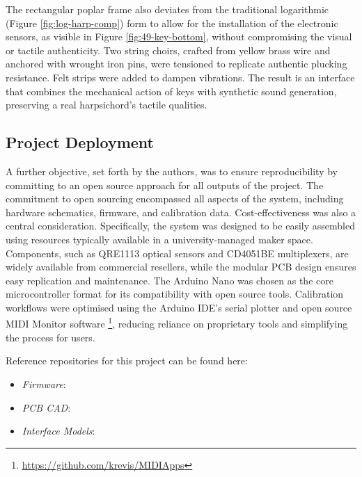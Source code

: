 The rectangular poplar frame also deviates from the traditional logarithmic (Figure \ref{fig:log-harp-comp}) form to allow for the installation of the electronic sensors, as visible in Figure \ref{fig:49-key-bottom}, without compromising the visual or tactile authenticity. Two string choirs, crafted from yellow brass wire and anchored with wrought iron pins, were tensioned to replicate authentic plucking resistance. Felt strips were added to dampen vibrations. The result is an interface that combines the mechanical action of keys with synthetic sound generation, preserving a real harpsichord's tactile qualities.


\subsection{Project Deployment}

A further objective, set forth by the authors, was to ensure reproducibility by committing to an open source approach for all outputs of the project. The commitment to open sourcing encompassed all aspects of the system, including hardware schematics, firmware, and calibration data. Cost-effectiveness was also a central consideration. 
Specifically, the system was designed to be easily assembled using resources typically available in a university-managed maker space. Components, such as QRE1113 optical sensors and CD4051BE multiplexers, are widely available from commercial resellers, while the modular PCB design ensures easy replication and maintenance. The Arduino Nano was chosen as the core microcontroller format for its compatibility with open source tools. Calibration workflows were optimised using the Arduino IDE’s serial plotter and open source MIDI Monitor software \footnote{\url{https://github.com/krevis/MIDIApps}}, reducing reliance on proprietary tools and simplifying the process for users. 

\begin{anonsuppress}
Reference repositories for this project can be found here:

    \begin{itemize}
        \item 
        \emph{Firmware}: 
        \item 
        \emph{PCB CAD}: 
        \item 
        \emph{Interface Models}: 
    \end{itemize}
\end{anonsuppress}



